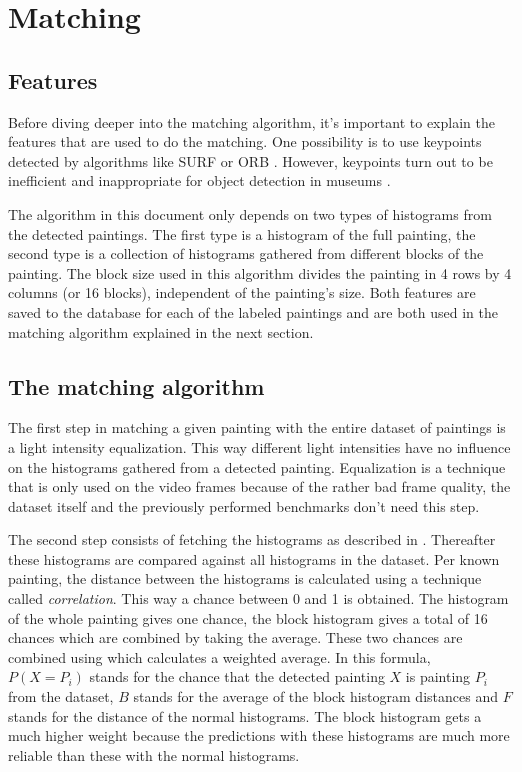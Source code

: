 \section{Matching}
\label{sec:matching}

\subsection{Features}
\label{subsec:the-features}

Before diving deeper into the matching algorithm, it's important to explain the features that are used to do the matching. One possibility is to use keypoints detected by algorithms like SURF \cite{bay2006surf} or ORB \cite{rublee2011orb}. However, keypoints turn out to be inefficient and inappropriate for object detection in museums \cite{bay2006interactive}.

The algorithm in this document only depends on two types of histograms from the detected paintings. The first type is a histogram of the full painting, the second type is a collection of histograms gathered from different blocks of the painting. The block size used in this algorithm divides the painting in 4 rows by 4 columns (or 16 blocks), independent of the painting's size. Both features are saved to the database for each of the labeled paintings and are both used in the matching algorithm explained in the next section.

\subsection{The matching algorithm}
\label{subsec:matching-algo}

The first step in matching a given painting with the entire dataset of paintings is a light intensity equalization. This way different light intensities have no influence on the histograms gathered from a detected painting. Equalization is a technique that is only used on the video frames because of the rather bad frame quality, the dataset itself and the previously performed benchmarks don't need this step. \cite{patel2013comparative}

The second step consists of fetching the histograms as described in . Thereafter these histograms are compared against all histograms in the dataset. Per known painting, the distance between the histograms is calculated using a technique called \emph{correlation}. This way a chance between 0 and 1 is obtained. The histogram of the whole painting gives one chance, the block histogram gives a total of 16 chances which are combined by taking the average. These two chances are combined using  which calculates a weighted average. In this formula, $P(X = P_{i})$ stands for the chance that the detected painting $X$ is painting $P_{i}$ from the dataset, $B$ stands for the average of the block histogram distances and $F$ stands for the distance of the normal histograms. The block histogram gets a much higher weight because the predictions with these histograms are much more reliable than these with the normal histograms.

